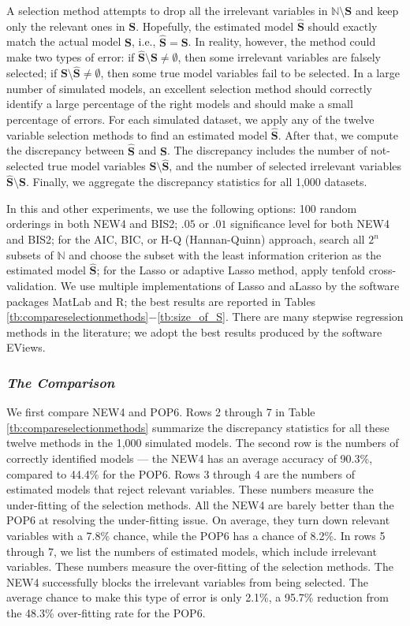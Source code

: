 \documentclass[a4paper,12pt]{article}
\begin{document}
A selection method attempts to drop all the irrelevant variables in $\mathbb{N}\setminus \mathbf{S}$ and keep only the relevant ones in $\mathbf{S}$.
Hopefully, the estimated model $\hat{\mathbf{S}}$ should exactly match the actual model $\mathbf{S}$, i.e., $\hat{\mathbf{S}} = \mathbf{S}$. 
In reality, however, the method could make two types of error:
if  $\hat{\mathbf{S}}\setminus \mathbf{S} \not = \emptyset$, then some irrelevant variables are falsely selected; 
if $\mathbf{S}\setminus \hat{\mathbf{S}} \not = \emptyset$, then some true model variables fail to be selected. 
In a large number of simulated models, an excellent selection method
should correctly identify a large percentage of the right models and should make a small percentage of errors. 
For each simulated dataset, we apply any of the twelve variable selection methods to find an estimated model $\hat{\mathbf{S}}$.
After that, we compute the discrepancy between  $\hat{\mathbf{S}}$ and  $\mathbf{S}$. 
The discrepancy includes the number of not-selected true model variables $\mathbf{S} \setminus \hat{\mathbf{S}}$,
and the number of selected irrelevant variables $\hat{\mathbf{S}} \setminus \mathbf{S}$.
Finally, we aggregate the discrepancy statistics for all 1,000 datasets.

In this and other experiments, we use the following options: 100 random orderings in both NEW4 and BIS2;
$.05$ or $.01$ significance level for both NEW4 and BIS2;
for the AIC, BIC, or H-Q (Hannan-Quinn) approach, search all $2^n$ subsets of $\mathbb{N}$ and choose the subset with the least information criterion as the estimated model $\hat{\mathbf{S}}$;
for the Lasso or adaptive Lasso method, apply tenfold cross-validation. 
We use multiple implementations of Lasso and aLasso by the software packages MatLab and R; the best results are reported in Tables \ref{tb:compareselectionmethods}$-$\ref{tb:size_of_S}.
There are many stepwise regression methods in the literature; we adopt the best results produced by the software EViews.


\subsubsection{\textit{The Comparison}}
\noindent 
We first compare NEW4 and POP6. Rows 2 through 7 in Table \ref{tb:compareselectionmethods} summarize the discrepancy statistics for all these twelve methods in the 1,000 simulated models. 
The second row is the numbers of correctly identified models --- the NEW4 has an average accuracy of 90.3\%, compared to 44.4\% for the POP6.  
Rows 3 through 4 are the numbers of estimated models that reject relevant variables. These numbers measure the under-fitting of the selection methods. 
All the NEW4 are barely better than the POP6 at resolving the under-fitting issue. 
On average, they turn down relevant variables with a 7.8\% chance, while the POP6 has a chance of 8.2\%.
In rows 5 through 7, we list the numbers of estimated models, which include irrelevant variables. 
These numbers measure the over-fitting of the selection methods. 
The NEW4 successfully blocks the irrelevant variables from being selected. 
The average chance to make this type of error is only 2.1\%, a 95.7\% reduction from the 48.3\% over-fitting rate for the POP6.
\end{document}
